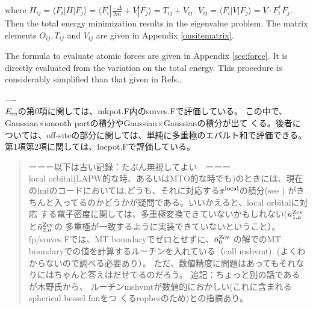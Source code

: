 \documentclass[twocolumn,showpacs,preprintnumbers,amsmath,amssymb,floatfix]{revtex4-1}
\newcommand{\ooplus}{\oplus}
\newcommand{\oominus}{\ominus}
\newcommand{\req}[1]{\mbox{Eq.~\!(\ref{#1})}}
\def\barnzcv{\bar{n}^{\rm Zcv}}
\begin{document}
where $H_{ij}= \langle F_i| H |F_{j} \rangle = 
\langle F_i| \frac{-\Delta}{2m} + V |F_{j} \rangle =T_{ij}+V_{ij}$.
$V_{ij}=\langle F_i|V|F_{j} \rangle=V \cdot F^*_i F_j$. 
Then the total energy minimization results in the eigenvalue problem.
The matrix elements $O_{ij},T_{ij}$
and $V_{ij}$ are given in Appendix \ref{onsitematrix}.

The formula to evaluate atomic forces are given in Appendix
\ref{sec:force}. It is directly evaluated from the variation on the
total energy. This procedure is considerably simplified than that given
in Refs.\cite{lmfchap,molforce}. 


----\\
$E_{\rm es}$の第0項に関しては、mkpot.F内のsmves.Fで評価している。
この中で、Gaussian$\times$smooth partの積分やGaussian$\times$Gaussianの積分が出て
くる。後者については、off-siteの部分に関しては、単純に多重極のエバルト和で評価できる。
第1項第2項に関しては、locpot.Fで評価している。


\begin{quote}
ーーー以下は古い記録：たぶん無視してよい　ーーー\\
local orbital(LAPW的な時、あるいはMTO的な時でも)のときには、現在
のlmfのコードにおいては,どうも、それに対応する$\pi^{\rm local}$の積分(see \cite{lmfchap})
がきちんと入ってるのかどうかが疑問である。いいかえると、local orbitalに対応
する電子密度に関しては、多重極変換できていないかもしれない($\barnzcv_{1,a}$と$\barnzcv_{2,a}$の
多重極が一致するように実装できていないということ）。
fp/smves.Fでは、MT boundaryでゼロとせずに、$\barnzcv_0$
の解でのMT boundaryでの値を計算するルーチンを入れている（call mshvmt).
(よくわからないので調べる必要あり）。
ただ、数値精度に問題はあってもそれなりにはちゃんと答えはだせてるのだろう。
追記：ちょっと別の話であるが木野氏から、
ルーチンmshvmtが数値的におかしい(これに含まれるspherical bessel funをつ
くるropbesのため)との指摘あり。
\end{quote}

\end{document}
